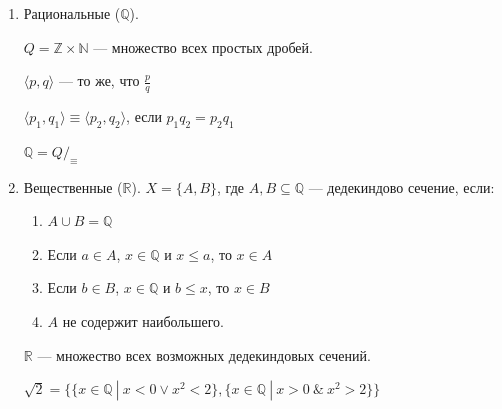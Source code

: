 \documentclass[aspectratio=169]{beamer}
\begin{document}
\begin{frame}{}
\begin{enumerate}
\item Рациональные ($\mathbb{Q}$).\pause

      $Q = \mathbb{Z} \times \mathbb{N}$ --- множество всех простых дробей.\pause

      $\langle p,q \rangle$ --- то же, что $\frac{p}{q}$ \pause

      $\langle p_1,q_1 \rangle \equiv \langle p_2, q_2 \rangle$, если $p_1q_2 = p_2q_1$\pause

\vspace{0.1cm}
      $\mathbb{Q} = Q/_\equiv$

\item Вещественные ($\mathbb{R}$). \pause $X = \{ A, B \}$, где $A,B \subseteq \mathbb{Q}$ --- дедекиндово сечение, если:\pause
\begin{enumerate}
\item $A\cup B = \mathbb{Q}$\pause
\item Если $a \in A$, $x \in \mathbb{Q}$ и $x \le a$, то $x \in A$\pause
\item Если $b \in B$, $x \in \mathbb{Q}$ и $b \le x$, то $x \in B$\pause
\item $A$ не содержит наибольшего.\pause
\end{enumerate}

       $\mathbb{R}$ --- множество всех возможных дедекиндовых сечений. \pause

$\sqrt 2 = \{\{ x\in\mathbb{Q}\ |\ x < 0 \vee x^2 < 2 \}, \{ x\in\mathbb{Q}\ |\ x > 0 \ \& \ x^2 > 2\}\}$
\end{enumerate}
\end{frame}
\end{document}
